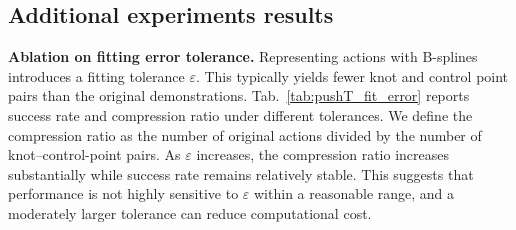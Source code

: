 \subsection{Additional experiments results}


\noindent\textbf{Ablation on fitting error tolerance.}
Representing actions with B-splines introduces a fitting tolerance $\varepsilon$.
This typically yields fewer knot and control point pairs than the original demonstrations.
Tab.~\ref{tab:pushT_fit_error} reports success rate and compression ratio under different tolerances.
We define the compression ratio as the number of original actions divided by the number of knot--control-point pairs.
As $\varepsilon$ increases, the compression ratio increases substantially while success rate remains relatively stable.
This suggests that performance is not highly sensitive to $\varepsilon$ within a reasonable range, and a moderately larger tolerance can reduce computational cost.







